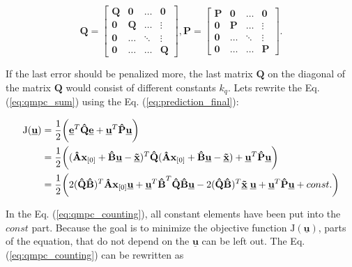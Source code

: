 \documentclass[a4paper,11pt,titlepage]{article}
\newcommand{\uvec}{\textbf{\underline{u}}}
\begin{document}
\begin{equation}
\label{eq:qmpc_weighting_matrices}
\textbf{\^Q} = \begin{bmatrix}
\textbf{Q} & \textbf{0} & \hdots & \textbf{0} \\
\textbf{0} & \textbf{Q} & \hdots & \vdots \\
\textbf{0} & \hdots & \ddots & \vdots \\
\textbf{0} & \hdots & \hdots & \textbf{Q}
\end{bmatrix},
\textbf{\^P} = \begin{bmatrix}
\textbf{P} & \textbf{0} & \hdots & \textbf{0} \\
\textbf{0} & \textbf{P} & \hdots & \vdots \\
\textbf{0} & \hdots & \ddots & \vdots \\
\textbf{0} & \hdots & \hdots & \textbf{P}
\end{bmatrix}.
\end{equation}

If the last error should be penalized more, the last matrix $\textbf{Q}$ on the diagonal of the matrix $\textbf{\^Q}$ would consist of different constants $k_q$. Lets rewrite the Eq. (\ref{eq:qmpc_sum}) using the Eq. (\ref{eq:prediction_final}):

\begin{equation}
\begin{split}
\label{eq:qmpc_counting}
\mathrm{J}(\underline{\textbf{u}}) 
&= \frac{1}{2}\bigg(\underline{\textbf{e}}^T 
\textbf{\^Q} \underline{\textbf{e}}+\underline{\textbf{u}}^T 
\textbf{\^P} \underline{\textbf{u}}\bigg)\\
&=\frac{1}{2}\bigg((\textbf{\^A}\textbf{x}_{[0]} + \textbf{\^B}	  \uvec-\underline{\textbf{\~x}})^T 
\textbf{\^Q}
(\textbf{\^A}\textbf{x}_{[0]} + \textbf{\^B}\uvec-\underline{\textbf{\~x}}) 
+\underline{\textbf{u}}^T 
\textbf{\^P} \underline{\textbf{u}}\bigg)\\
&=\frac{1}{2}\bigg(
2(\textbf{\^Q}\textbf{\^B})^T \textbf{\^A} \textbf{x}_{[0]} \underline{\textbf{u}}
+\uvec^T \textbf{\^B}^T\textbf{\^Q} \textbf{\^B}\uvec
-2(\textbf{\^Q}\textbf{\^B})^T \underline{\textbf{\~x}}\; \underline{\textbf{u}}
+\underline{\textbf{u}}^T 
\textbf{\^P} \underline{\textbf{u}}+const.\bigg)
\end{split}
\end{equation}

In the Eq. (\ref{eq:qmpc_counting}), all constant elements have been put into the $const$ part. Because the goal is to minimize the objective function $\mathrm{J}(\underline{\textbf{u}})$, parts of the equation, that do not depend on the $\underline{\textbf{u}}$ can be left out. The Eq. (\ref{eq:qmpc_counting}) can be rewritten as
\end{document}
